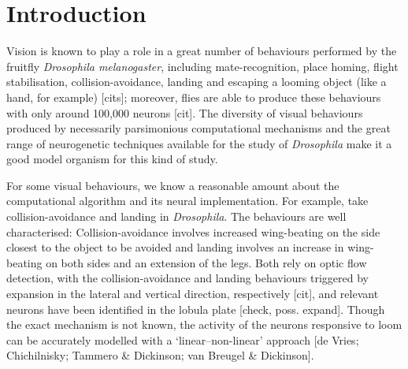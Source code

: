 \section*{Introduction}
Vision is known to play a role in a great number of behaviours performed by the fruitfly \emph{Drosophila melanogaster}, including mate-recognition, place homing, flight stabilisation, collision-avoidance, landing and escaping a looming object (like a hand, for example) [cits];
moreover, flies are able to produce these behaviours with only around 100,000 neurons [cit].
The diversity of visual behaviours produced by necessarily parsimonious computational mechanisms and the great range of neurogenetic techniques available for the study of \emph{Drosophila} make it a good model organism for this kind of study.

For some visual behaviours, we know a reasonable amount about the computational algorithm and its neural implementation.
For example, take collision-avoidance and landing in \emph{Drosophila}.
The behaviours are well characterised:
Collision-avoidance involves increased wing-beating on the side closest to the object to be avoided and landing involves an increase in wing-beating on both sides and an extension of the legs.
Both rely on optic flow detection, with the collision-avoidance and landing behaviours triggered by expansion in the lateral and vertical direction, respectively [cit], and relevant neurons have been identified in the lobula plate [check, poss. expand].
Though the exact mechanism is not known, the activity of the neurons responsive to loom can be accurately modelled with a `linear--non-linear' approach [de Vries; Chichilnisky; Tammero \& Dickinson; van Breugel \& Dickinson].

